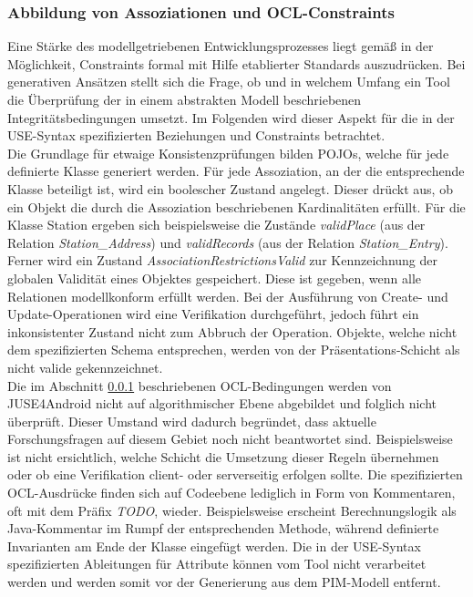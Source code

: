 \documentclass[a4paper,twoside]{article}
\begin{document}
\subsubsection{Abbildung von Assoziationen und OCL-Constraints}\label{ssec:ocl}
Eine Stärke des modellgetriebenen Entwicklungsprozesses liegt gemäß \cite{SWOT} in der Möglichkeit, Constraints formal mit Hilfe etablierter Standards auszudrücken. Bei generativen Ansätzen stellt sich die Frage, ob und in welchem Umfang ein Tool die Überprüfung der in einem abstrakten Modell beschriebenen Integritätsbedingungen umsetzt. Im Folgenden wird dieser Aspekt für die in der USE-Syntax spezifizierten Beziehungen und Constraints betrachtet. 
\\

Die Grundlage für etwaige Konsistenzprüfungen bilden POJOs, welche für jede definierte Klasse generiert werden. Für jede Assoziation, an der die entsprechende Klasse beteiligt ist, wird ein boolescher Zustand angelegt. Dieser drückt aus, ob ein Objekt die durch die Assoziation beschriebenen Kardinalitäten erfüllt. Für die Klasse Station ergeben sich beispielsweise die Zustände \textit{validPlace} (aus der Relation \textit{Station\_Address}) und \textit{validRecords} (aus der Relation \textit{Station\_Entry}). Ferner wird ein Zustand \textit{AssociationRestrictionsValid} zur Kennzeichnung der globalen Validität eines Objektes gespeichert. Diese ist gegeben, wenn alle Relationen modellkonform erfüllt werden. Bei der Ausführung von Create- und Update-Operationen wird eine Verifikation durchgeführt, jedoch führt ein inkonsistenter Zustand nicht zum Abbruch der Operation. Objekte, welche nicht dem spezifizierten Schema entsprechen, werden von der Präsentations-Schicht als nicht valide gekennzeichnet.
\\

Die im Abschnitt \ref{ssec:ocl} beschriebenen OCL-Bedingungen werden von JUSE4Android nicht auf algorithmischer Ebene abgebildet und folglich nicht überprüft. \cite[S.59]{SilvaMasterThesis} Dieser Umstand wird dadurch begründet, dass aktuelle Forschungsfragen auf diesem Gebiet noch nicht beantwortet sind. Beispielsweise ist nicht ersichtlich, welche Schicht die Umsetzung dieser Regeln übernehmen oder ob eine Verifikation client- oder serverseitig erfolgen sollte. \cite[S.107]{SilvaMasterThesis} 
Die spezifizierten OCL-Ausdrücke finden sich auf Codeebene lediglich in Form von Kommentaren, oft mit dem Präfix \textit{TODO}, wieder. Beispielsweise erscheint Berechnungslogik als Java-Kommentar im Rumpf der entsprechenden Methode, während definierte Invarianten am Ende der Klasse eingefügt werden. Die in der USE-Syntax spezifizierten Ableitungen für Attribute können vom Tool nicht verarbeitet werden und werden somit vor der Generierung aus dem PIM-Modell entfernt. 
\end{document}
